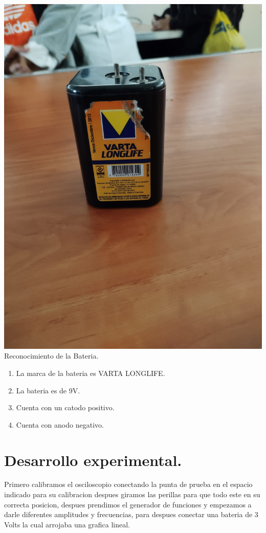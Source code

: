 \documentclass[10pt]{article}
\begin{document}
\begin{multicols}{2}
\begin{center}
\includegraphics[scale=0.1]{Imagenes/bateria.png}\\
Reconocimiento de la Bateria.
\begin{enumerate}
\item La marca de la bateria es VARTA LONGLIFE.
\item La bateria es de 9V.
\item Cuenta con un catodo positivo.
\item Cuenta con anodo negativo.
\end{enumerate}
\end{center}
 

\section{Desarrollo experimental.}
Primero calibramos el osciloscopio conectando la punta de prueba en el espacio indicado para su calibracion despues giramos las perillas para que todo este en su correcta posicion, despues prendimos el generador de funciones y empezamos a darle diferentes amplitudes y frecuencias, para despues conectar una bateria de 3 Volts la cual arrojaba una grafica lineal.

\end{multicols}
\end{document}
